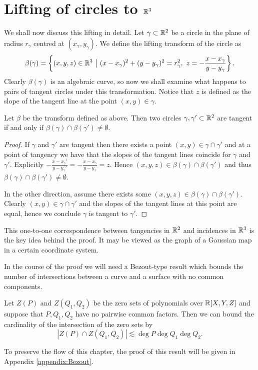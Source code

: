 \section{Lifting of circles to $\mathbb R^3$}

We shall now discuss this lifting in detail. Let $\gamma \subset \mathbb R^2$ be a circle in the plane of radius $r_{\gamma}$ centred at $(x_\gamma, y_\gamma)$. 
We define the lifting transform of the circle as \[
    \beta(\gamma) = \left \{ (x,y,z) \in \mathbb R^3 \ \big | \ (x-x_\gamma)^2 + (y-y_\gamma)^2 = r_\gamma^2, \ z = - \frac{x-x_\gamma}{y-y_\gamma} \right \}.
\]  
Clearly $\beta(\gamma)$ is an algebraic curve, so now we shall examine what happens to pairs of tangent circles under this transformation. Notice that $z$ is defined as the slope of the tangent line
at the point $(x,y) \in \gamma$.

\begin{lemma}
    Let $\beta$ be the transform defined as above. 
    Then two circles $\gamma, \gamma' \subset \mathbb R^2$ are tangent if and only if $\beta(\gamma) \cap \beta(\gamma') \neq \emptyset$.    \label{lem:beta-lift}
\end{lemma}
\begin{proof}
If $\gamma$ and $\gamma'$ are tangent then there exists a point $(x,y) \in \gamma \cap \gamma'$ and
at a point of tangency we have that the slopes of the tangent lines coincide for $\gamma$ and $\gamma'$. Explicitly $-\frac{x-x_\gamma'}{y - y_\gamma'}= -\frac{x-x_\gamma}{y - y_\gamma} = z$.
Hence $(x,y,z) \in \beta(\gamma) \cap \beta(\gamma')$ and thus $ \beta(\gamma) \cap \beta(\gamma') \neq \emptyset$.

In the other direction, assume there exists some $(x,y,z) \in \beta(\gamma) \cap \beta(\gamma')$. 
Clearly $(x,y) \in \gamma \cap \gamma'$ and the slopes of the tangent lines at this point are equal,
hence we conclude $\gamma$ is tangent to $\gamma'$.
\end{proof}
This one-to-one correspondence between tangencies in $\mathbb R^2$ and incidences in $\mathbb R^3$ is the key idea behind the proof. 
It may be viewed as the graph of a Gaussian map in a certain coordinate system.

In the course of the proof we will need a Bezout-type result which bounds the number of intersections between a curve and a surface with no common components.
\begin{lemma}     \label{lem:Bezout}
   Let $Z(P)$ and $Z(Q_1,Q_2)$ be the zero sets of polynomials over $\mathbb R[X,Y,Z]$ and suppose that $P,Q_1,Q_2$ have no pairwise common factors.
 Then we can bound the cardinality of the intersection of the zero sets by
    \[ |Z(P) \cap Z(Q_1,Q_2)| \lesssim \deg P \deg Q_1 \deg Q_2.\]
\end{lemma}
To preserve the flow of this chapter, the proof of this result will be given in Appendix \ref{appendix:Bezout}.

